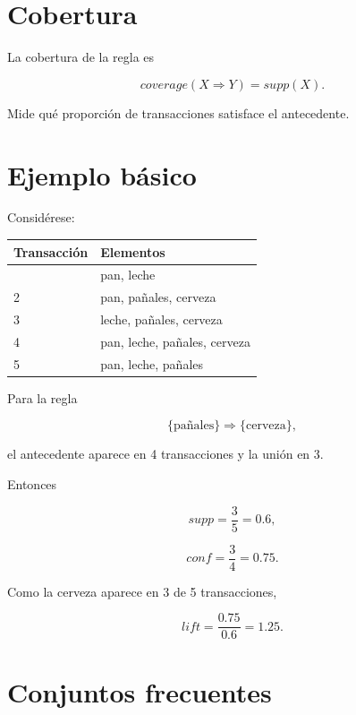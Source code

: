 \documentclass[
  spanish,
  10.5pt,
  letterpaper,
  DIV=11,
  numbers=noendperiod,
  oneside,
  open=any]{scrreprt}
\newcounter{none} %
\theoremstyle{definition}
\theoremstyle{definition}
\theoremstyle{plain}
\theoremstyle{remark}
\begin{document}
\section*{Cobertura}\label{cobertura}


La cobertura de la regla es

\[
coverage(X\Rightarrow Y)
=
supp(X).
\]

Mide qué proporción de transacciones satisface el antecedente.

\section*{Ejemplo básico}\label{ejemplo-buxe1sico}


Considérese:

{\def\LTcaptype{none} %
\begin{longtable}[]{@{}ll@{}}
\toprule\noalign{}
Transacción & Elementos \\
\midrule\noalign{}
\endhead
\bottomrule\noalign{}
\endlastfoot
1 & pan, leche \\
2 & pan, pañales, cerveza \\
3 & leche, pañales, cerveza \\
4 & pan, leche, pañales, cerveza \\
5 & pan, leche, pañales \\
\end{longtable}
}

Para la regla

\[
\{\text{pañales}\}
\Rightarrow
\{\text{cerveza}\},
\]

el antecedente aparece en 4 transacciones y la unión en 3.

Entonces

\[
supp=\frac{3}{5}=0.6,
\]

\[
conf=\frac{3}{4}=0.75.
\]

Como la cerveza aparece en 3 de 5 transacciones,

\[
lift
=
\frac{0.75}{0.6}
=
1.25.
\]

\section*{Conjuntos frecuentes}\label{conjuntos-frecuentes}
\end{document}
